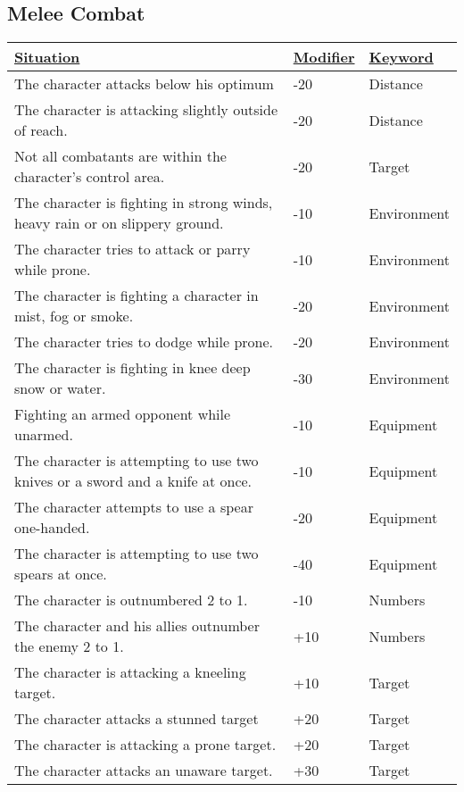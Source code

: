 \subsection{Melee Combat}
\begin{tabularx}{\textwidth}{|X|l|l|}
	\hline
	\ul{Situation} & \ul{Modifier} & \ul{Keyword} \\ \hline
	The character attacks below his optimum & -20 & Distance \\ \hline
	The character is attacking slightly outside of reach. & -20 & Distance \\ \hline
	Not all combatants are within the character's control area. & -20 & Target \\ \hline
	The character is fighting in strong winds, heavy rain or on slippery ground. & -10 & Environment \\ \hline
	The character tries to attack or parry while prone. & -10 & Environment \\ \hline
	The character is fighting a character in mist, fog or smoke. & -20 & Environment \\ \hline
	The character tries to dodge while prone. & -20 & Environment \\ \hline
	The character is fighting in knee deep snow or water. & -30 & Environment \\ \hline
	Fighting an armed opponent while unarmed. & -10 & Equipment \\ \hline
	The character is attempting to use two knives or a sword and a knife at once. & -10 & Equipment \\ \hline
	The character attempts to use a spear one-handed. & -20 & Equipment \\ \hline
	The character is attempting to use two spears at once. & -40 & Equipment \\ \hline
	The character is outnumbered 2 to 1. & -10 & Numbers \\ \hline
	The character and his allies outnumber the enemy 2 to 1. & +10 & Numbers \\ \hline
	The character is attacking a kneeling target. & +10 & Target \\ \hline
	The character attacks a stunned target & +20 & Target \\ \hline
	The character is attacking a prone target. & +20 & Target \\ \hline
	The character attacks an unaware target. & +30 & Target \\ \hline
\end{tabularx}
